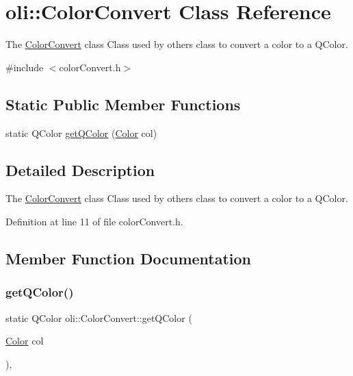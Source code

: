 \hypertarget{classoli_1_1_color_convert}{}\section{oli\+:\+:Color\+Convert Class Reference}
\label{classoli_1_1_color_convert}


The \hyperlink{classoli_1_1_color_convert}{Color\+Convert} class Class used by others class to convert a color to a Q\+Color.  




{\ttfamily \#include $<$color\+Convert.\+h$>$}

\subsection*{Static Public Member Functions}
\begin{DoxyCompactItemize}
\item 
static Q\+Color \hyperlink{classoli_1_1_color_convert_a4c41280d24ad2cba4b2a46fbb03f2356}{get\+Q\+Color} (\hyperlink{namespaceoli_aac44697e43b3ab2ad32fe892ab2276eb}{Color} col)
\end{DoxyCompactItemize}


\subsection{Detailed Description}
The \hyperlink{classoli_1_1_color_convert}{Color\+Convert} class Class used by others class to convert a color to a Q\+Color. 

Definition at line 11 of file color\+Convert.\+h.



\subsection{Member Function Documentation}
\hypertarget{classoli_1_1_color_convert_a4c41280d24ad2cba4b2a46fbb03f2356}{}\label{classoli_1_1_color_convert_a4c41280d24ad2cba4b2a46fbb03f2356} 
\subsubsection{\texorpdfstring{get\+Q\+Color()}{getQColor()}}
{\footnotesize\ttfamily static Q\+Color oli\+::\+Color\+Convert\+::get\+Q\+Color (\begin{DoxyParamCaption}\item[{\hyperlink{namespaceoli_aac44697e43b3ab2ad32fe892ab2276eb}{Color}}]{col }\end{DoxyParamCaption})\hspace{0.3cm}{\ttfamily [inline]}, {\ttfamily [static]}}



